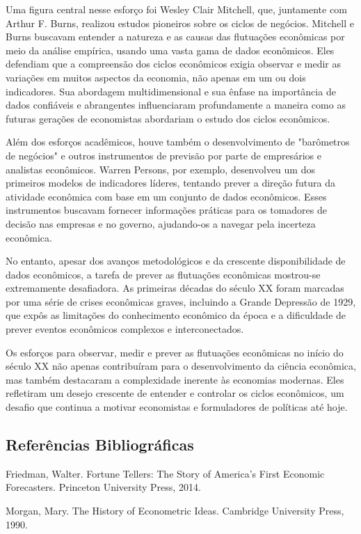 \documentclass[a4paper,12pt]{article}[abntex2]
\begin{document}
Uma figura central nesse esforço foi Wesley Clair Mitchell, que, juntamente com Arthur F. Burns, realizou estudos pioneiros sobre os ciclos de negócios. Mitchell e Burns buscavam entender a natureza e as causas das flutuações econômicas por meio da análise empírica, usando uma vasta gama de dados econômicos. Eles defendiam que a compreensão dos ciclos econômicos exigia observar e medir as variações em muitos aspectos da economia, não apenas em um ou dois indicadores. Sua abordagem multidimensional e sua ênfase na importância de dados confiáveis e abrangentes influenciaram profundamente a maneira como as futuras gerações de economistas abordariam o estudo dos ciclos econômicos.

Além dos esforços acadêmicos, houve também o desenvolvimento de "barômetros de negócios" e outros instrumentos de previsão por parte de empresários e analistas econômicos. Warren Persons, por exemplo, desenvolveu um dos primeiros modelos de indicadores líderes, tentando prever a direção futura da atividade econômica com base em um conjunto de dados econômicos. Esses instrumentos buscavam fornecer informações práticas para os tomadores de decisão nas empresas e no governo, ajudando-os a navegar pela incerteza econômica.

No entanto, apesar dos avanços metodológicos e da crescente disponibilidade de dados econômicos, a tarefa de prever as flutuações econômicas mostrou-se extremamente desafiadora. As primeiras décadas do século XX foram marcadas por uma série de crises econômicas graves, incluindo a Grande Depressão de 1929, que expôs as limitações do conhecimento econômico da época e a dificuldade de prever eventos econômicos complexos e interconectados.

Os esforços para observar, medir e prever as flutuações econômicas no início do século XX não apenas contribuíram para o desenvolvimento da ciência econômica, mas também destacaram a complexidade inerente às economias modernas. Eles refletiram um desejo crescente de entender e controlar os ciclos econômicos, um desafio que continua a motivar economistas e formuladores de políticas até hoje.

\subsection{\textbf{Referências Bibliográficas}}
Friedman, Walter. Fortune Tellers: The Story of America's First Economic Forecasters.
Princeton University Press, 2014.

Morgan, Mary. The History of Econometric Ideas. Cambridge University Press, 1990.
\end{document}
